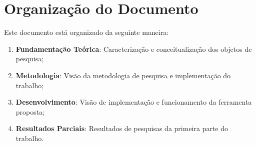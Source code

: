\section{Organização do Documento}
\label{sec:org}

Este documento está organizado da seguinte maneira:

\begin{enumerate}
  \item \textbf{Fundamentação Teórica}: Caracterização e conceitualização dos
    objetos de pesquisa;
  \item \textbf{Metodologia}: Visão da metodologia de pesquisa e implementação
    do trabalho;
  \item \textbf{Desenvolvimento}: Visão de implementação e funcionamento da
    ferramenta proposta;
  \item \textbf{Resultados Parciais}: Resultados de pesquisas da primeira
    parte do trabalho.
\end{enumerate}

